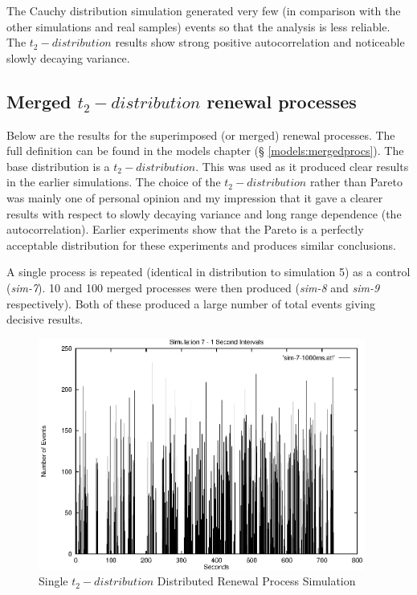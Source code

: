 The Cauchy distribution simulation generated very few (in comparison
with the other simulations and real samples) events so that the
analysis is less reliable.  The $t_2-distribution$ results show strong
positive autocorrelation and noticeable slowly decaying variance.

\clearpage

\subsection{Merged $t_2-distribution$ renewal processes}

Below are the results for the superimposed (or merged) renewal
processes.  The full definition can be found in the models chapter (\S
\ref{models:mergedprocs}).  The base distribution is a $t_2-distribution$.
This was used as it produced clear results in the earlier simulations.
The choice of the $t_2-distribution$ rather than Pareto was mainly one
of personal opinion and my impression that it gave a clearer results
with respect to slowly decaying variance and long range dependence
(the autocorrelation).  Earlier experiments show that the Pareto is a
perfectly acceptable distribution for these experiments and produces
similar conclusions.

A single process is repeated (identical in distribution to simulation
5) as a control (\emph{sim-7}). 10 and 100 merged processes were then
produced (\emph{sim-8} and \emph{sim-9} respectively).  Both of these
produced a large number of total events giving decisive results.

\begin{figure}[h]
\includegraphics[height=3in]{pics/sim-7-1s-freq.eps}
\caption{Single $t_2-distribution$ Distributed Renewal Process Simulation}
\label{simulation:sim7.1s.freq}
\end{figure}

